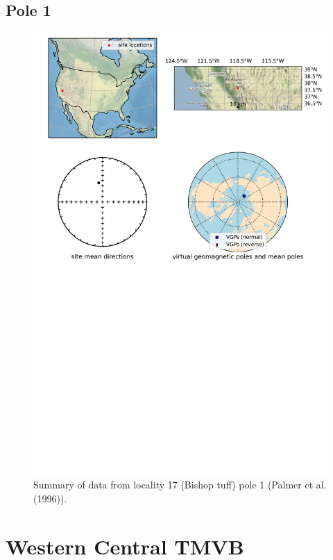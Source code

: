 \documentclass{article}
\begin{document}
\subsection{Pole 1}


\begin{figure}[H]
\centering
\includegraphics[width=5 in]{./17/1/pole_summary.png}
\caption{Summary of data from locality 17 (Bishop tuff) pole 1 (Palmer et al. (1996)).}
\end{figure}

\section{Western Central TMVB}
\end{document}
